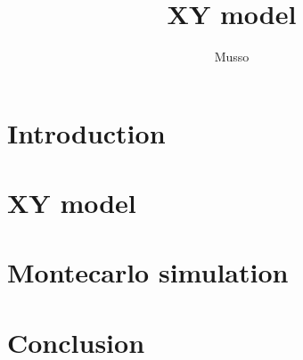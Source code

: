 \documentclass[12pt,twoside,openany]{report}
\title{XY model}
\author{Musso}
\date{}
\begin{document}
\maketitle

\tableofcontents
{}

\chapter{Introduction}



\chapter{XY model}



\chapter{Montecarlo simulation}



\chapter{Conclusion}


\printbibliography
\end{document}
